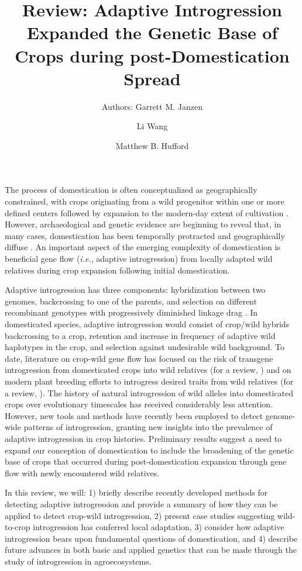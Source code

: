 \documentclass[11pt]{article}
\title{Review: Adaptive Introgression Expanded the Genetic Base of Crops during post-Domestication Spread}
\author[1]{Authors: Garrett M. Janzen}%
\author[1]{Li Wang}
\author[1,*]{Matthew B. Hufford}
\affil[1]{Department of Ecology, Evolution, and Organismal Biology, Iowa State University, Ames, Iowa, USA}
\affil[*]{Correspondence: mhufford@iastate.edu (M.B. Hufford)}
\date{}
\begin{document}
\maketitle



The process of domestication is often conceptualized as geographically constrained, with crops originating from a wild progenitor within one or more defined centers followed by expansion to the modern-day extent of cultivation \cite{Harlan1992}.
However, archaeological and genetic evidence are beginning to reveal that, in many cases, domestication has been temporally protracted and geographically diffuse \cite{brown2009complex, Meyer2016, wang2017, zhou2017, Fuller2014}.
An important aspect of the emerging complexity of domestication is beneficial gene flow (\emph{i.e.}, adaptive introgression) from locally adapted wild relatives during crop expansion following initial domestication.


Adaptive introgression has three components: hybridization between two genomes, backcrossing to one of the parents, and selection on different recombinant genotypes with progressively diminished linkage drag \cite{barton2001role, Feuillet200824}.
In domesticated species, adaptive introgression would consist of crop/wild hybrids backcrossing to a crop, retention and increase in frequency of adaptive wild haplotypes in the crop, and selection against undesirable wild background.
To date, literature on crop-wild gene flow has focused on the risk of transgene introgression from domesticated crops into wild relatives (for a review, \cite{stewart2003transgene}) and on modern plant breeding efforts to introgress desired traits from wild relatives (for a review, \cite{Dempewolf2017}).
The history of natural introgression of wild alleles into domesticated crops over evolutionary timescales has received considerably less attention.
However, new tools and methods have recently been employed to detect genome-wide patterns of introgression, granting new insights into the prevalence of adaptive introgression in crop histories.
Preliminary results suggest a need to expand our conception of domestication to include the broadening of the genetic base of crops that occurred during post-domestication expansion through gene flow with newly encountered wild relatives.


In this review, we will: 1) briefly describe recently developed methods for detecting adaptive introgression and provide a summary of how they can be applied to detect crop-wild introgression, 2) present case studies suggesting wild-to-crop introgression has conferred local adaptation, 3) consider how adaptive introgression bears upon fundamental questions of domestication, and 4) describe future advances in both basic and applied genetics that can be made through the study of introgression in agroecosystems.
\end{document}
